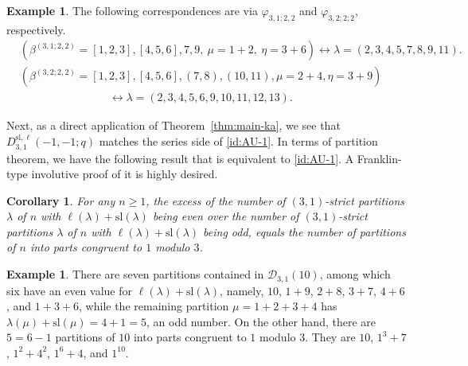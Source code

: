 \documentclass[11pt,reqno]{amsart}
\numberwithin{equation}{section}
\theoremstyle{plain}
\newtheorem{corollary}[theorem]{Corollary}
\theoremstyle{definition}
\newtheorem{example}[theorem]{Example}
\def\sl{\mathrm{sl}}
\def\la{\lambda}
\newcommand{\D}{\mathcal{D}}
\begin{document}
\begin{example}
The following correspondences are via $\varphi_{3,1;2,2}$ and $\varphi_{3,2;2;2}$, respectively.
\begin{align*}
&\left(\beta^{(3, 1; 2, 2)}=[1, 2, 3], [4, 5, 6], 7, 9,~\mu=1+2,~\eta=3+6\right)\longleftrightarrow \lambda=(2, 3, 4, 5, 7, 8, 9, 11).\\
&\left(\beta^{(3, 2; 2, 2)}=[1, 2, 3], [4, 5, 6], (7, 8), (10, 11), \mu=2+4, \eta=3+9\right) \\
&\qquad\qquad\qquad\qquad \longleftrightarrow \lambda=(2, 3, 4, 5, 6, 9, 10, 11, 12, 13).
\end{align*}
\end{example}

Next, as a direct application of Theorem~\ref{thm:main-ka}, we see that $D^{\sl,\ell}_{3,1}(-1,-1;q)$ matches the series side of \eqref{id:AU-1}. In terms of partition theorem, we have the following result that is equivalent to \eqref{id:AU-1}. A Franklin-type involutive proof of it is highly desired.
\begin{corollary}\label{cor:AU1 par}
For any $n\ge 1$, the excess of the number of $(3,1)$-strict partitions $\la$ of $n$ with $\ell(\la)+\sl(\la)$ being even over the number of $(3,1)$-strict partitions $\la$ of $n$ with $\ell(\la)+\sl(\la)$ being odd, equals the number of partitions of $n$ into parts congruent to $1$ modulo $3$.
\end{corollary}

\begin{example}
There are seven partitions contained in $\D_{3,1}(10)$, among which six have an even value for $\ell(\la)+\sl(\la)$, namely, $10$, $1+9$, $2+8$, $3+7$, $4+6$, and $1+3+6$, while the remaining partition $\mu=1+2+3+4$ has $\la(\mu)+\sl(\mu)=4+1=5$, an odd number. On the other hand, there are $5=6-1$ partitions of $10$ into parts congruent to $1$ modulo $3$. They are $10$, $1^3+7$, $1^2+4^2$, $1^6+4$, and $1^{10}$.
\end{example}
\end{document}
